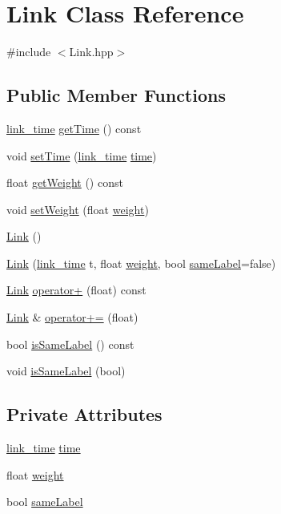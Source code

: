 \hypertarget{class_link}{\section{Link Class Reference}
\label{class_link}
}


{\ttfamily \#include $<$Link.\+hpp$>$}

\subsection*{Public Member Functions}
\begin{DoxyCompactItemize}
\item 
\hyperlink{_link_8hpp_aaf44f94a2cc67ec8ddd81004137e8369}{link\+\_\+time} \hyperlink{class_link_af3dac01ac8fb3c9d9637361bab37a8f7}{get\+Time} () const 
\item 
void \hyperlink{class_link_af8b4ae699e66876e9fe933b0d979838f}{set\+Time} (\hyperlink{_link_8hpp_aaf44f94a2cc67ec8ddd81004137e8369}{link\+\_\+time} \hyperlink{class_link_acb992140e3cf154c36fd94ab8184e00e}{time})
\item 
float \hyperlink{class_link_aaf7980526f4edf059b27602a7be82b2a}{get\+Weight} () const 
\item 
void \hyperlink{class_link_add219a5edb1c6a97ae46f5f1ab360a22}{set\+Weight} (float \hyperlink{class_link_a61f8b4a76aa028011dbe75affc1b44f7}{weight})
\item 
\hyperlink{class_link_a1918a8473cee40bbed17b8e926cb85d9}{Link} ()
\item 
\hyperlink{class_link_ae744492cec1a0e4dac79070ab7beb3d3}{Link} (\hyperlink{_link_8hpp_aaf44f94a2cc67ec8ddd81004137e8369}{link\+\_\+time} t, float \hyperlink{class_link_a61f8b4a76aa028011dbe75affc1b44f7}{weight}, bool \hyperlink{class_link_ae5f10e1961b948c4a5e71e6702c68de0}{same\+Label}=false)
\item 
\hyperlink{class_link}{Link} \hyperlink{class_link_ae3cc4f9078e2f6f1b642667d49b9dc02}{operator+} (float) const 
\item 
\hyperlink{class_link}{Link} \& \hyperlink{class_link_a71e54bce5f5f7244144c7f7cf4b826a6}{operator+=} (float)
\item 
bool \hyperlink{class_link_a1eaa1a41eb1bcc0563786d60d7eb45c0}{is\+Same\+Label} () const 
\item 
void \hyperlink{class_link_a8270edfed8ba5ace14c55393282cf77a}{is\+Same\+Label} (bool)
\end{DoxyCompactItemize}
\subsection*{Private Attributes}
\begin{DoxyCompactItemize}
\item 
\hyperlink{_link_8hpp_aaf44f94a2cc67ec8ddd81004137e8369}{link\+\_\+time} \hyperlink{class_link_acb992140e3cf154c36fd94ab8184e00e}{time}
\item 
float \hyperlink{class_link_a61f8b4a76aa028011dbe75affc1b44f7}{weight}
\item 
bool \hyperlink{class_link_ae5f10e1961b948c4a5e71e6702c68de0}{same\+Label}
\end{DoxyCompactItemize}


